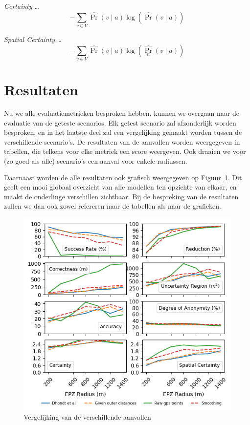 \textit{Certainty} \ldots
\begin{equation}
    -\sum_{v \in V} \widehat{\operatorname{Pr}}(v \mid a) \log (\widehat{\operatorname{Pr}}(v \mid a))\label{eq:certainty}
\end{equation}

\textit{Spatial Certainty} \ldots
\begin{equation}
    -\sum_{v \in V} \widehat{\operatorname{Pr}}(v \mid a) \log \left(\widehat{\operatorname{Pr}_n}(v \mid a)\right)\label{eq:spatial_certainty}
\end{equation}

\section{Resultaten}
Nu we alle evaluatiemetrieken besproken hebben, kunnen we overgaan naar de
evaluatie van de geteste scenarios. Elk getest scenario zal afzonderlijk worden
besproken, en in het laatste deel zal een vergelijking gemaakt worden tussen de
verschillende scenario's. De resultaten van de aanvallen worden weergegeven in
tabellen, die telkens voor elke metriek een score weergeven. Ook draaien we
voor (zo goed als alle) scenario's een aanval voor enkele radiussen.

Daarnaast worden de alle resultaten ook grafisch weergegeven op
Figuur~\ref{fig:attack_comparison}. Dit geeft een mooi globaal overzicht van
alle modellen ten opzichte van elkaar, en maakt de onderlinge verschillen
zichtbaar. Bij de bespreking van de resultaten zullen we dan ook zowel
refereren naar de tabellen als naar de grafieken.

\begin{figure}[h]
    \centering
    \includegraphics[width=\textwidth]{fig/result_graphs/all_results.png}
    \caption{Vergelijking van de verschillende aanvallen}\label{fig:attack_comparison}
\end{figure}

